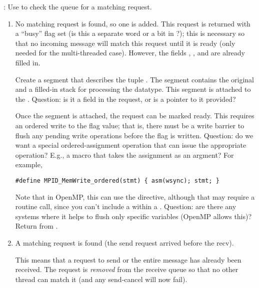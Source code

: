 \begin{mmadi}
\begin{tcp}
:
Use  to check the queue for a matching
request.   
\begin{enumerate}
\item No matching request is found, so one is added.
This request is returned with a ``busy'' flag set (is this a separate word or
a bit  in ?); this is
necessary so that no incoming message will match this request until it is
ready (only needed for the multi-threaded case).  However, the fields
, 
, and  are already
filled in.  

Create a segment that describes the tuple .
The segment contains the original  and a filled-in
stack  for processing the datatype.  This
segment is attached to the .  Question: is it a field
in the request, or is a pointer to it provided?  

Once the segment is attached, the request can be marked ready.
This requires an ordered write to the flag value; that is, there must be a write barrier to flush any pending write
operations before the flag is written.
Question: do we want a special ordered-assignment operation that can issue the
appropriate operation?  E.g., a  macro that takes
the assignment as an argment?  For example,
\begin{verbatim}
#define MPID_MemWrite_ordered(stmt) { asm(wsync); stmt; }
\end{verbatim}
Note that in OpenMP, this can use the  directive, although that
may require a routine call, since you can't include a  within a
.  Question: are there any systems where it helps to flush only
specific variables  (OpenMP allows this)?
Return from .

\item A matching request is found (the send request arrived before the recv).

This means that a request to send or the entire message has already been
received. 
The request is \emph{removed} from the receive queue so that no other thread
can match it (and any send-cancel will now fail).


\end{enumerate}
\end{tcp}
\end{mmadi}
